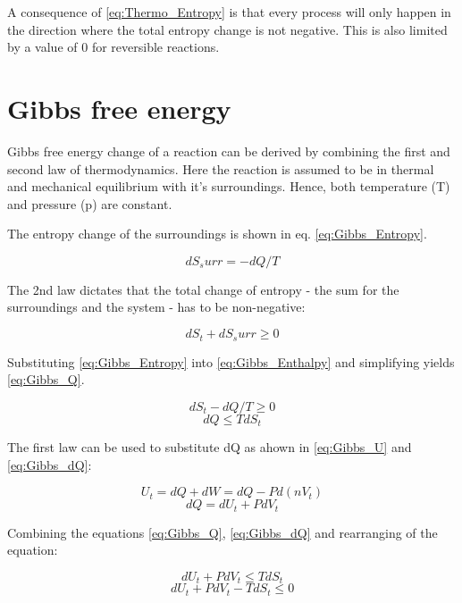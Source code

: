 A consequence of \ref{eq:Thermo_Entropy} is that every process will only happen in the direction where the total entropy change is not negative. This is also limited by a value of 0 for reversible reactions. 

\section{Gibbs free energy}
Gibbs free energy change of a reaction can be derived by combining the first and second law of thermodynamics. Here the reaction is assumed to be in thermal and mechanical equilibrium with it's surroundings. Hence, both temperature (T) and pressure (p) are constant.

The entropy change of the surroundings is shown in eq. \ref{eq:Gibbs_Entropy}.

\begin{equation}
    dS_surr = - dQ/T
    \label{eq:Gibbs_Entropy}
\end{equation}

The 2nd law dictates that the total change of entropy - the sum for the surroundings and the system - has to be non-negative:

\begin{equation}
    dS_t + dS_surr \geq 0 
    \label{eq:Gibbs_Enthalpy}
\end{equation}

Substituting \ref{eq:Gibbs_Entropy} into \ref{eq:Gibbs_Enthalpy} and simplifying yields \ref{eq:Gibbs_Q}.

\begin{equation}
    dS_t - dQ/T \geq 0
    \label{eq:Gibbs_0}
\end{equation}
\begin{equation}
    dQ \leq TdS_t
    \label{eq:Gibbs_Q}
\end{equation}

The first law can be used to substitute dQ as ahown in \ref{eq:Gibbs_U} and \ref{eq:Gibbs_dQ}:

\begin{equation}
    U_t = dQ + dW = dQ - Pd(nV_t)
    \label{eq:Gibbs_U}
\end{equation}
\begin{equation}
    dQ = dU_t + PdV_t
    \label{eq:Gibbs_dQ}
\end{equation}

Combining the equations \ref{eq:Gibbs_Q}, \ref{eq:Gibbs_dQ} and rearranging of the equation:

\begin{equation}
    dU_t + PdV_t \leq TdS_t
    \label{eq:Gibbs_dU_t}
\end{equation}
\begin{equation}
    dU_t + PdV_t - TdS_t \leq 0
    \label{eq:Gibbs_leq_0}
\end{equation}

